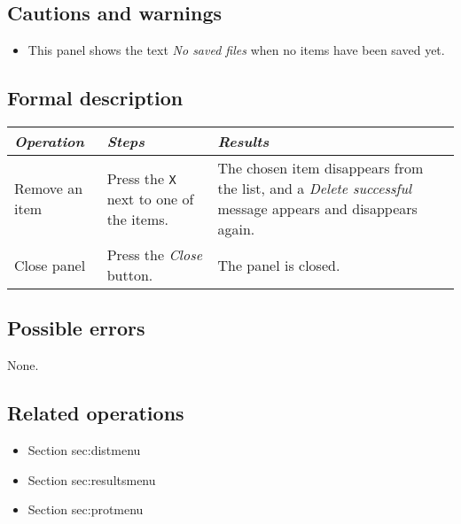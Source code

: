  \subsection*{Cautions and warnings}
  \begin{itemize}
  \item This panel shows the text \emph{No saved files} when no items have been saved yet.
  \end{itemize}

  \subsection*{Formal description}
    \begin{tabularx}{\textwidth}{XXX}
    \toprule
    \emph{Operation} & \emph{Steps} & \emph{Results} \\
    \midrule
    Remove an item & Press the \texttt{X} next to one of the items. &  The chosen item disappears from the list, and a \emph{Delete successful} message appears and disappears again. \\
    \midrule
    Close panel & Press the \emph{Close} button. & The panel is closed. \\
    \bottomrule
\end{tabularx}

  \subsection*{Possible errors}
  None.

  \subsection*{Related operations}
   \begin{itemize}
   \item Section {sec:distmenu}
   \item Section {sec:resultsmenu}
   \item Section {sec:protmenu}
  \end{itemize}
  
